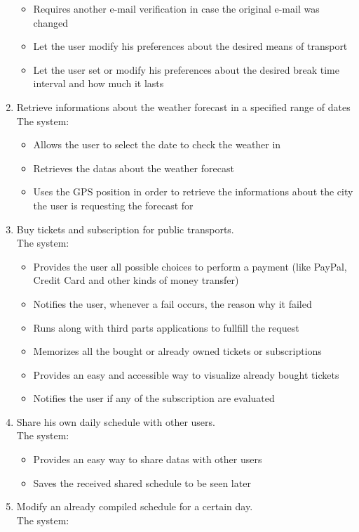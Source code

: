 \documentclass[numbers=noenddot, 12pt, a4paper, oneside]{scrbook}
\begin{document}
\begin{enumerate}
\begin{itemize}
		\item Requires another e-mail verification in case the original e-mail was changed
		\item Let the user modify his preferences about the desired means of transport
		\item Let the user set or modify his preferences about the desired break time interval and how much it lasts
	\end{itemize}
	\item Retrieve informations about the weather forecast in a specified range of dates
	\\The system:
	\begin{itemize}
		\item Allows the user to select the date to check the weather in
		\item Retrieves the datas about the weather forecast
		\item Uses the GPS position in order to retrieve the informations about the city the user is requesting the forecast for
	\end{itemize}
	\item Buy tickets and subscription for public transports.\\The system:
	\begin{itemize}
		\item Provides the user all possible choices to perform a payment (like PayPal, Credit Card and other kinds of money transfer)
		\item Notifies the user, whenever a fail occurs, the reason why it failed
		\item Runs along with third parts applications to fullfill the request
		\item Memorizes all the bought or already owned tickets or subscriptions
		\item Provides an easy and accessible way to visualize already bought tickets
		\item Notifies the user if any of the subscription are evaluated
	\end{itemize}
	\item Share his own daily schedule with other users.\\The system:
	\begin{itemize}
		\item Provides an easy way to share datas with other users
		\item Saves the received shared schedule to be seen later
	\end{itemize}
	\item Modify an already compiled schedule for a certain day.\\The system:

\end{enumerate}
\end{document}
